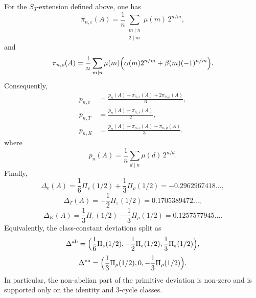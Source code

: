 \begin{corollary}
  \label{cor:s3-example-profile}
  For the \(S_3\)-extension defined above, one has
  \begin{equation}\label{eq:s3-example-primitive-sign-coefficients}
    \pi_{n,\varepsilon}(A)
    =
    \frac{1}{n}
      \sum_{\substack{m\mid n\\ 2\mid m}}
        \mu(m)\,2^{n/m},
  \end{equation}
  and
  \begin{equation}\label{eq:s3-example-primitive-rho-coefficients}
    \pi_{n,\rho}(A)
    =
    \frac{1}{n}
      \sum_{m\mid n}
        \mu(m)\Bigl(
          \alpha(m)2^{n/m}+\beta(m)(-1)^{n/m}
        \Bigr).
  \end{equation}
  Consequently,
  \begin{equation}\label{eq:s3-example-primitive-classes}
    \begin{aligned}
      p_{n,e}
      &=\frac{p_n(A)+\pi_{n,\varepsilon}(A)+2\pi_{n,\rho}(A)}{6}, \\
      p_{n,T}
      &=\frac{p_n(A)-\pi_{n,\varepsilon}(A)}{2}, \\
      p_{n,K}
      &=\frac{p_n(A)+\pi_{n,\varepsilon}(A)-\pi_{n,\rho}(A)}{3}.
    \end{aligned}
  \end{equation}
  where
  \begin{equation}\label{eq:s3-example-full-two-shift-primitive}
    p_n(A)=\frac{1}{n}\sum_{d\mid n}\mu(d)\,2^{n/d}.
  \end{equation}
  Finally,
  \begin{equation}\label{eq:s3-example-delta-values}
    \Delta_e(A)
    =\frac16\Pi_\varepsilon(1/2)+\frac13\Pi_\rho(1/2)
    =-0.2962967418\ldots,
  \end{equation}
  \begin{equation}\label{eq:s3-example-delta-t-value}
    \Delta_T(A)
    =-\frac12\Pi_\varepsilon(1/2)
    =0.1705389472\ldots,
  \end{equation}
  \begin{equation}\label{eq:s3-example-delta-k-value}
    \Delta_K(A)
    =\frac13\Pi_\varepsilon(1/2)-\frac13\Pi_\rho(1/2)
    =0.1257577945\ldots.
  \end{equation}
  Equivalently, the class-constant deviations split as
  \begin{equation}\label{eq:s3-example-abelian-shadow}
    \Delta^{\mathrm{ab}}
    =
    \Bigl(
      \frac16\Pi_\varepsilon(1/2),
      -\frac12\Pi_\varepsilon(1/2),
      \frac13\Pi_\varepsilon(1/2)
    \Bigr),
  \end{equation}
  \begin{equation}\label{eq:s3-example-nonabelian-defect}
    \Delta^{\mathrm{na}}
    =
    \Bigl(
      \frac13\Pi_\rho(1/2),
      0,
      -\frac13\Pi_\rho(1/2)
    \Bigr).
  \end{equation}
  In particular, the non-abelian part of the primitive deviation is
  non-zero and is supported only on the identity and \(3\)-cycle
  classes.
\end{corollary}


